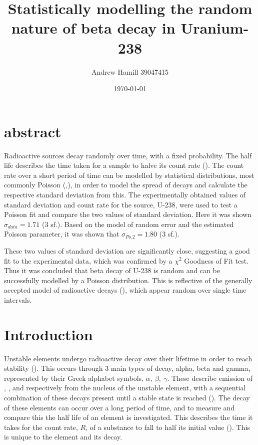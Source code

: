 \documentclass[11pt]{article}
\begin{document}
\title{\vspace{-1cm}Statistically modelling the random nature of beta decay in Uranium-238}
    \author{Andrew Hamill 39047415}
    \date{\today}
    \maketitle
    \section{abstract}
Radioactive sources decay randomly over time, with a fixed probability. The half life describes the time taken for a sample to halve its count rate (\cite{YF}). The count rate over a short period of time can be modelled by statistical distributions, most commonly Poisson (\cite{campbell2008poisson},\cite{buczyk2009poisson}), in order to model the spread of decays and calculate the respective standard deviation from this. The experimentally obtained values of standard deviation and count rate for the source, U-238, were used to test a Poisson fit and compare the two values of standard deviation. Here it was shown $\sigma_{data} = 1.71$ (3 sf.). Based on the model of random error and the estimated Poisson parameter, it was shown that $\sigma_{Po.2} = 1.80$ (3 sf.).
     
\noindent These two values of standard deviation are significantly close, suggesting a good fit to the experimental data, which was confirmed by a $\chi^{2}$ Goodness of Fit test. Thus it was concluded that beta decay of U-238 is random and can be successfully modelled by a Poisson distribution. This is reflective of the generally accepted model of radioactive decays (\cite{YF}), which appear random over single time intervals.  
    \section{Introduction}
Unstable elements undergo radioactive decay over their lifetime in order to reach stability (\cite{YF}). This occurs through 3 main types of decay, alpha, beta and gamma, represented by their Greek alphabet symbols, $\alpha,\  \beta,\ \gamma$.  These describe emission of , , and  respectively from the nucleus of the unstable element, with a sequential combination of these decays present until a stable state is reached (\cite{Magill2005}). The decay of these elements can occur over a long period of time, and to measure and compare this the half life of an element is investigated. This describes the time it takes for the count rate, $R$, of a substance to fall to half its initial value (\cite{YF}). This is unique to the element and its decay.
    
\end{document}
